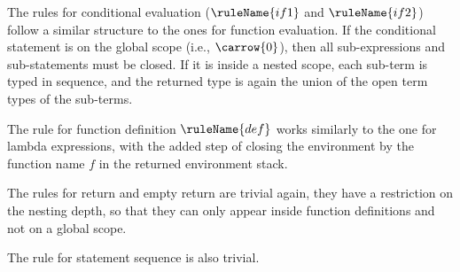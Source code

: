 The rules for conditional evaluation ($\ruleName{if1}$ and $\ruleName{if2}$) follow a similar structure to the ones for
function evaluation. If the conditional statement is on the global scope (i.e., $\carrow{0}$), then all sub-expressions
and sub-statements must be closed. If it is inside a nested scope, each sub-term is typed in sequence, and the
returned type is again the union of the open term types of the sub-terms.  

The rule for function definition $\ruleName{def}$ works similarly to the one for lambda expressions, with the added step of
closing the environment by the function name $f$ in the returned environment stack.

The rules for return and empty return are trivial again, they have a restriction on the nesting depth, so that they can only
appear inside function definitions and not on a global scope.

The rule for statement sequence is also trivial.



